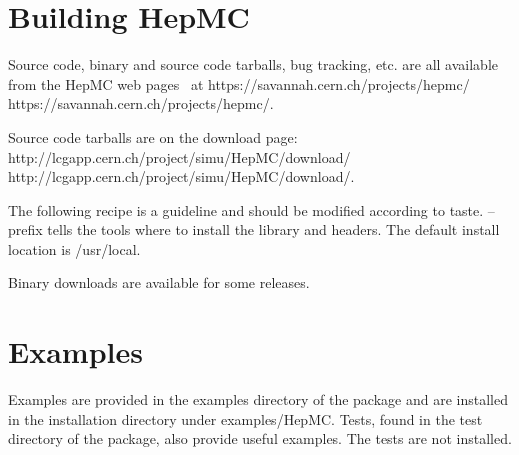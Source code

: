 \documentclass[11pt,letterpaper]{article}
\begin{document}
\section{Building HepMC}

Source code, binary and source code tarballs, bug tracking, etc. are
all available from the HepMC web pages~\cite{LCGHepMC} at  
\htmladdnormallink
{https://savannah.cern.ch/projects/hepmc/}
{https://savannah.cern.ch/projects/hepmc/}.

Source code tarballs are on the download page:
\htmladdnormallink
{http://lcgapp.cern.ch/project/simu/HepMC/download/}
{http://lcgapp.cern.ch/project/simu/HepMC/download/}.

\vspace{0.5cm}
\begin{myitemize}
 {The following recipe is a guideline and should be modified according to taste.}
    {--prefix tells the tools where to install the library and headers.
     The default install location is /usr/local.}
\end{myitemize}

Binary downloads are available for some releases.

%
%

\section{Examples}
\label{examples}
Examples are provided in the examples directory of the package 
and are installed in the installation directory under examples/HepMC.
Tests, found in the test directory of the package, also provide useful examples.
The tests are not installed.
\end{document}
